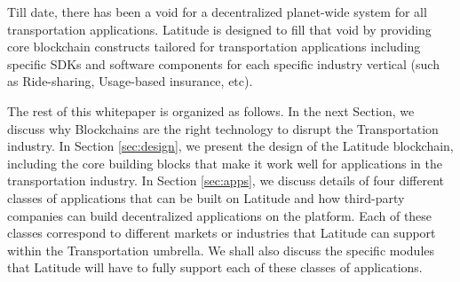 Till date, there has been a void for a decentralized planet-wide system for all transportation applications. Latitude is
designed to fill that void by providing core blockchain constructs tailored for transportation applications including
specific SDKs and software components for each specific industry vertical (such as Ride-sharing, Usage-based insurance,
etc).

The rest of this whitepaper is organized as follows. In the next Section, we discuss why Blockchains are the right
technology to disrupt the Transportation industry. In Section \ref{sec:design}, we present the design of the Latitude
blockchain, including the core building blocks that make it work well for applications in the transportation industry.
In Section \ref{sec:apps}, we discuss details of four different classes of applications that can be built on Latitude
and how third-party companies can build decentralized applications on the platform. Each of these classes correspond to
different markets or industries that Latitude can support within the Transportation umbrella. We shall also discuss the
specific modules that Latitude will have to fully support each of these classes of applications.


%

